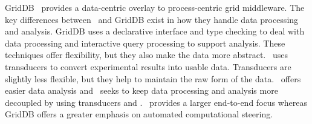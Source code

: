 GridDB~\cite{griddb} provides a data-centric overlay to process-centric grid
middleware.  The key differences between \name\ and GridDB exist in how they
handle data processing and analysis.  GridDB uses a declarative interface and
type checking to deal with data processing and interactive query processing to
support analysis.  These techniques offer flexibility, but they also make the
data more abstract.  \name\ uses transducers to convert experimental results
into usable data.  Transducers are slightly less flexible, but they help to
maintain the raw form of the data.  \dbviz\ offers easier data analysis and
\name\ seeks to keep data processing and analysis more decoupled by using
transducers and \dbviz.  \name\ provides a larger end-to-end focus whereas
GridDB offers a greater emphasis on automated computational steering.
